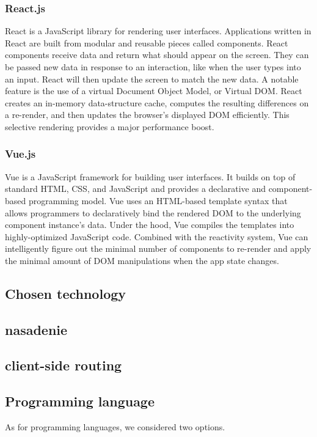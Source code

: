 \subsubsection*{React.js}
React is a JavaScript library for rendering user interfaces.
Applications written in React are built from modular and reusable pieces called components.
React components receive data and return what should appear on the screen. 
They can be passed new data in response to an interaction, like when the user types into an input. 
React will then update the screen to match the new data.
A notable feature is the use of a virtual Document Object Model, or Virtual DOM. 
React creates an in-memory data-structure cache, computes the resulting differences on a re-render, and then updates the browser's displayed DOM efficiently. 
This selective rendering provides a major performance boost.

\subsubsection*{Vue.js}
Vue is a JavaScript framework for building user interfaces. 
It builds on top of standard HTML, CSS, and JavaScript and provides a declarative and component-based programming model.
Vue uses an HTML-based template syntax that allows programmers to declaratively bind the rendered DOM to the underlying component instance's data.
Under the hood, Vue compiles the templates into highly-optimized JavaScript code. 
Combined with the reactivity system, Vue can intelligently figure out the minimal number of components to re-render and apply the minimal amount of DOM manipulations when the app state changes.

\subsection*{Chosen technology}


\subsection{nasadenie}

\subsection{client-side routing}

\subsection{Programming language}
As for programming languages, we considered two options. 


